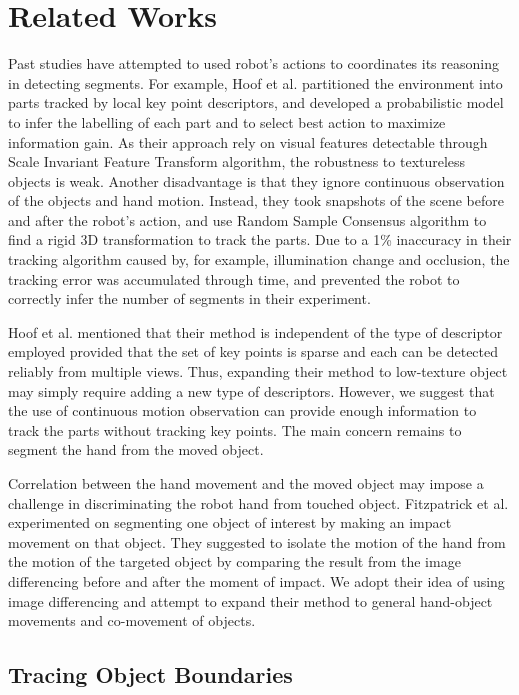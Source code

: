 \documentclass{article}
\begin{document}
\section{Related Works}

Past studies have attempted to used robot's actions to coordinates its reasoning in detecting segments. For example, Hoof et al. \cite{herke} partitioned the environment into parts tracked by local key point descriptors, and developed a probabilistic model to infer the labelling of each part and to select best action to maximize information gain. As their approach rely on visual features detectable through Scale Invariant Feature Transform algorithm, the robustness to textureless objects is weak. Another disadvantage is that they ignore continuous observation of the objects and hand motion. Instead, they took snapshots of the scene before and after the robot's action, and use Random Sample Consensus algorithm to find a rigid 3D transformation to track the parts. Due to a 1\% inaccuracy in their tracking algorithm caused by, for example, illumination change and occlusion, the tracking error was accumulated through time, and prevented the robot to correctly infer the number of segments in their experiment. 

Hoof et al. mentioned that their method is independent of the type of descriptor employed provided that the set of key points is sparse and each can be detected reliably from multiple views. Thus, expanding their method to low-texture object may simply require adding a new type of descriptors. However, we suggest that the use of continuous motion observation can provide enough information to track the parts without tracking key points. The main concern remains to segment the hand from the moved object.

Correlation between the hand movement and the moved object may impose a challenge in discriminating the robot hand from touched object. Fitzpatrick et al. \cite{max-flow} experimented on segmenting one object of interest by making an impact movement on that object. They suggested to isolate the motion of the hand from the motion of the targeted object by comparing the result from the image differencing before and after the moment of impact. We adopt their idea of using image differencing and attempt to expand their method to general hand-object movements and co-movement of objects.

\subsection{Tracing Object Boundaries}
\end{document}
